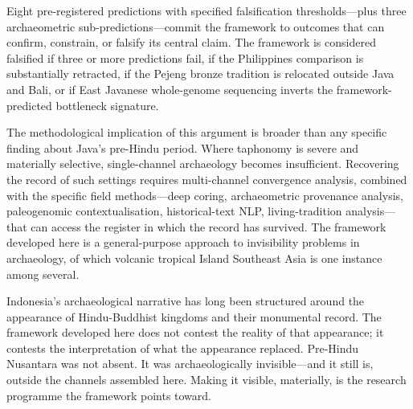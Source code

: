 \documentclass[12pt,a4paper]{article}
\begin{document}
Eight pre-registered predictions with specified falsification thresholds---plus three archaeometric sub-predictions---commit the framework to outcomes that can confirm, constrain, or falsify its central claim. The framework is considered falsified if three or more predictions fail, if the Philippines comparison is substantially retracted, if the Pejeng bronze tradition is relocated outside Java and Bali, or if East Javanese whole-genome sequencing inverts the framework-predicted bottleneck signature.

The methodological implication of this argument is broader than any specific finding about Java's pre-Hindu period. Where taphonomy is severe and materially selective, single-channel archaeology becomes insufficient. Recovering the record of such settings requires multi-channel convergence analysis, combined with the specific field methods---deep coring, archaeometric provenance analysis, paleogenomic contextualisation, historical-text NLP, living-tradition analysis---that can access the register in which the record has survived. The framework developed here is a general-purpose approach to invisibility problems in archaeology, of which volcanic tropical Island Southeast Asia is one instance among several.

Indonesia's archaeological narrative has long been structured around the appearance of Hindu-Buddhist kingdoms and their monumental record. The framework developed here does not contest the reality of that appearance; it contests the interpretation of what the appearance replaced. Pre-Hindu Nusantara was not absent. It was archaeologically invisible---and it still is, outside the channels assembled here. Making it visible, materially, is the research programme the framework points toward.



\end{document}
